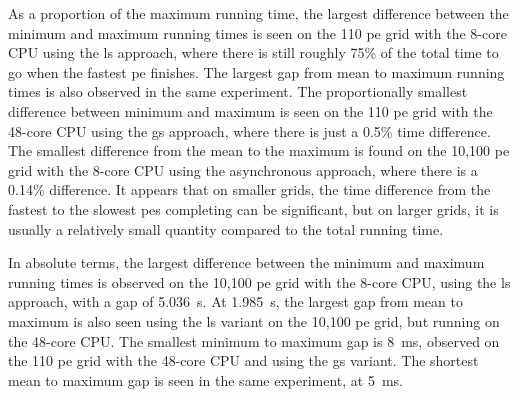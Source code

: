 As a proportion of the maximum running time, the largest difference between the minimum and maximum running times is seen on the 110 \gls{pe} grid with the 8-core CPU using the \gls{ls} approach, where there is still roughly 75\% of the total time to go when the fastest \gls{pe} finishes.  The largest gap from mean to maximum running times is also observed in the same experiment.  The proportionally smallest difference between minimum and maximum is seen on the 110 \gls{pe} grid with the 48-core CPU using the \gls{gs} approach, where there is just a 0.5\% time difference.  The smallest difference from the mean to the maximum is found on the 10,100 \gls{pe} grid with the 8-core CPU using the asynchronous approach, where there is a 0.14\% difference.  It appears that on smaller grids, the time difference from the fastest to the slowest \glspl{pe} completing can be significant, but on larger grids, it is usually a relatively small quantity compared to the total running time.

In absolute terms, the largest difference between the minimum and maximum running times is observed on the 10,100 \gls{pe} grid with the 8-core CPU, using the \gls{ls} approach, with a gap of \qty{5.036}{\second}.  At \qty{1.985}{\second}, the largest gap from mean to maximum is also seen using the \gls{ls} variant on the 10,100 \gls{pe} grid, but running on the 48-core CPU.  The smallest minimum to maximum gap is \qty{8}{\milli\second}, observed on the 110 \gls{pe} grid with the 48-core CPU and using the \gls{gs} variant.  The shortest mean to maximum gap is seen in the same experiment, at \qty{5}{\milli\second}.

